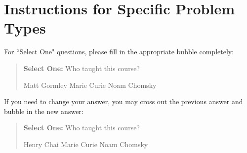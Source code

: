 \documentclass[11pt,addpoints,answers]{exam}
\newcommand{\blackcircle}{\tikz\draw[black,fill=black] (0,0) circle (1ex);}
\begin{document}



\section*{Instructions for Specific Problem Types}

For ``Select One" questions, please fill in the appropriate bubble completely:

\begin{quote}
\textbf{Select One:} Who taught this course?
    \begin{checkboxes}
     \CorrectChoice Matt Gormley
     \choice Marie Curie
     \choice Noam Chomsky
    \end{checkboxes}
\end{quote}

If you need to change your answer, you may cross out the previous answer and bubble in the new answer:

\begin{quote}
\textbf{Select One:} Who taught this course?
    {
    \begin{checkboxes}
     \CorrectChoice Henry Chai
     \choice Marie Curie \checkboxchar{\xcancel{\blackcircle}{}}
     \choice Noam Chomsky
    \end{checkboxes}
    }
\end{quote}
\end{document}
